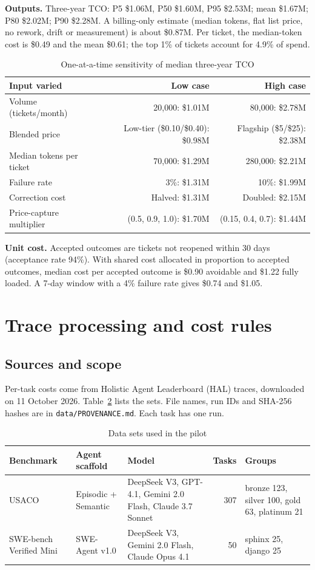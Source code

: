 \documentclass[10pt]{article}
\begin{document}
\textbf{Outputs.} Three-year TCO: P5 \$1.06M, P50 \$1.60M, P95 \$2.53M; mean \$1.67M; P80 \$2.02M; P90 \$2.28M. A billing-only estimate (median tokens, flat list price, no rework, drift or measurement) is about \$0.87M. Per ticket, the median-token cost is \$0.49 and the mean \$0.61; the top 1\% of tickets account for 4.9\% of spend.

\begin{table}[h]
\caption{One-at-a-time sensitivity of median three-year TCO}\label{tab:sens}
\centering\small
\begin{tabular}{lrr}
\toprule
Input varied & Low case & High case \\
\midrule
Volume (tickets/month) & 20{,}000: \$1.01M & 80{,}000: \$2.78M \\
Blended price & Low-tier (\$0.10/\$0.40): \$0.98M & Flagship (\$5/\$25): \$2.38M \\
Median tokens per ticket & 70{,}000: \$1.29M & 280{,}000: \$2.21M \\
Failure rate & 3\%: \$1.31M & 10\%: \$1.99M \\
Correction cost & Halved: \$1.31M & Doubled: \$2.15M \\
Price-capture multiplier & (0.5, 0.9, 1.0): \$1.70M & (0.15, 0.4, 0.7): \$1.44M \\
\bottomrule
\end{tabular}
\end{table}

\textbf{Unit cost.} Accepted outcomes are tickets not reopened within 30 days (acceptance rate 94\%). With shared cost allocated in proportion to accepted outcomes, median cost per accepted outcome is \$0.90 avoidable and \$1.22 fully loaded. A 7-day window with a 4\% failure rate gives \$0.74 and \$1.05.

\section{Trace processing and cost rules}
\subsection{Sources and scope}
Per-task costs come from Holistic Agent Leaderboard (HAL) traces, downloaded on 11 October 2026. Table~\ref{tab:data} lists the sets. File names, run IDs and SHA-256 hashes are in \texttt{data/PROVENANCE.md}. Each task has one run.

\begin{table}[h]
\caption{Data sets used in the pilot}\label{tab:data}
\centering\small
\begin{tabular}{p{2.6cm}p{2.6cm}p{4.4cm}rp{3.6cm}}
\toprule
Benchmark & Agent scaffold & Model & Tasks & Groups \\
\midrule
USACO & Episodic + Semantic & DeepSeek V3, GPT-4.1, Gemini 2.0 Flash, Claude 3.7 Sonnet & 307 & bronze 123, silver 100, gold 63, platinum 21 \\
SWE-bench Verified Mini & SWE-Agent v1.0 & DeepSeek V3, Gemini 2.0 Flash, Claude Opus 4.1 & 50 & sphinx 25, django 25 \\
\bottomrule
\end{tabular}
\end{table}
\end{document}
